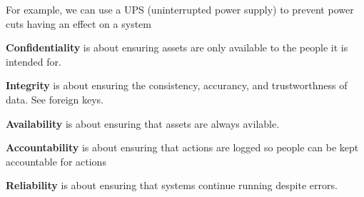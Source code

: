 For example, we can use a UPS (uninterrupted power supply) to prevent power cuts having an effect on a system

\begin{definition}[Confidentiality]
    \textbf{Confidentiality} is about ensuring assets are only available to the people it is intended for.
\end{definition}

\begin{definition}[Integrity]
   \textbf{Integrity} is about ensuring the consistency, accurancy, and trustworthness of data. See foreign keys. 
\end{definition}

\begin{definition}[Availability]
    \textbf{Availability} is about ensuring that assets are always avilable.
\end{definition}

\begin{definition}[Accountability]
    \textbf{Accountability} is about ensuring that actions are logged so people can be kept accountable for actions
\end{definition}

\begin{definition}[Reliability]
   \textbf{Reliability} is about ensuring that systems continue running despite errors. 
\end{definition}

